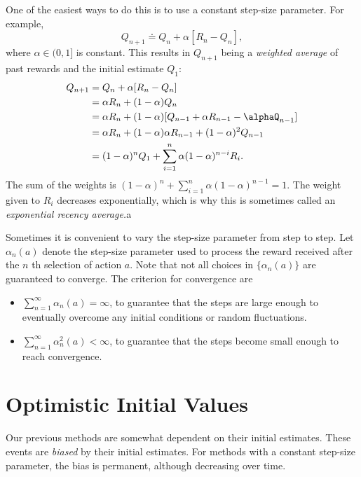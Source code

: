 {One of the easiest ways to do this is to use a constant step-size parameter. For example,
\begin{equation}
\label{e.2.cons}
Q_{n+1} \doteq Q_n+ \alpha [R_n- Q_n] 
,\end{equation}
where $\alpha\in (0,1]$ is constant. This results in  $Q_{n+1}$ being a \textit{weighted average} of past rewards and the initial estimate $Q_1$:
\begin{align*}
    Q_{n+1} &= Q_n + \alpha[R_n-Q_n] \\
            &= \alpha R_n + (1-\alpha)Q_n \\
            &= \alpha R_n + (1-\alpha)[Q_{n-1}+ \alpha R_{n-1}- \alphaQ_{n-1}] \\
            &=  \alpha R_n + (1-\alpha)\alpha R_{n-1}+ (1-\alpha)^2Q_{n-1} \\
            &= (1-\alpha)^{n} Q_1 + \sum_{i=1}^{n} \alpha(1-\alpha)^{n-i}R_i
.\end{align*}
The sum of the weights is $(1-\alpha)^{n}+ \sum_{i=1}^{n} \alpha(1-\alpha)^{n-1}=1$. The weight given to $R_i$ decreases exponentially, which is why this is sometimes called an \textit{exponential recency average.}a

Sometimes it is convenient to vary the step-size parameter from step to step. Let $\alpha_n(a)$ denote the step-size parameter used to process the reward received after the $n$ th selection of action $a$. Note that not all choices in $\{\alpha_n(a)\} $ are guaranteed to converge. The criterion for convergence are
\begin{itemize}
    \item $\sum_{n=1}^{\infty} \alpha_n(a)= \infty$, to guarantee that the steps are large enough to eventually overcome any initial conditions or random fluctuations.
    \item $\sum_{n=1}^{\infty} \alpha_n^2(a)< \infty$, to guarantee that the steps become small enough to reach convergence.
\end{itemize}
\section{Optimistic Initial Values}
Our previous methods are somewhat dependent on their initial estimates. These events are \textit{biased} by their initial estimates. For methods with a constant step-size parameter, the bias is permanent, although decreasing over time.

}
